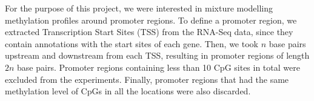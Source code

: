For the purpose of this project, we were interested in mixture modelling methylation profiles around promoter regions. To define a promoter region, we extracted Transcription Start Sites (TSS) from the RNA-Seq data, since they contain annotations with the start sites of each gene. Then, we took $n$ base pairs upstream and downstream from each TSS, resulting in promoter regions of length $2n$ base pairs. Promoter regions containing less than 10 CpG sites in total were excluded from the experiments. Finally, promoter regions that had the same methylation level of CpGs in all the locations were also discarded. 

